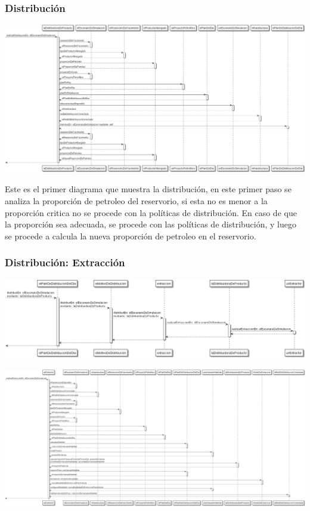 \documentclass[10pt,a4paper]{article}
\begin{document}
\subsubsection{Distribución}

\centerline{\includegraphics[scale=0.325]{images/secuenciaDistribucion.png}}

Este es el primer diagrama que muestra la distribución, en este primer paso se analiza la proporción de petroleo del reservorio, si esta no es menor a la proporción critica no se procede con la políticas de distribución. En caso de que la proporción sea adecuada, se procede con las políticas de distribución, y luego se procede a calcula la nueva proporción de petroleo en el reservorio.

\subsubsection{Distribución: Extracción}

\centerline{\includegraphics[scale=0.325]{images/secuenciaDistribucionMotivo1.png}}
\vspace{0.25cm}
\centerline{\includegraphics[scale=0.2]{images/secuenciaDistribucionMotivo2.png}}
\end{document}
